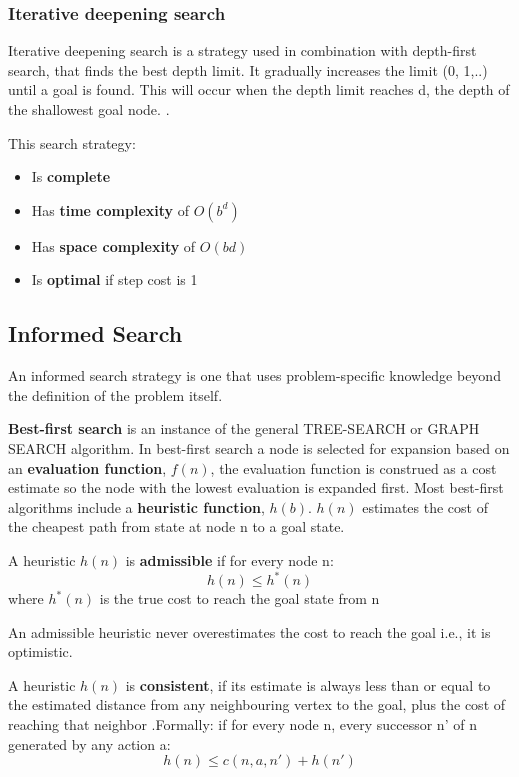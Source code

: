 \documentclass{article}
\begin{document}
\subsubsection{Iterative deepening search}

Iterative deepening search is a strategy used in combination with depth-first search, that finds the best depth limit. It gradually increases the limit (0, 1,..) until a goal is found. This will occur when the depth limit reaches d, the depth of the shallowest goal node. . 

This search strategy:
\begin{itemize}
    \item Is \textbf{complete} 
    \item Has \textbf{time complexity} of $O(b^d)$ 
    \item Has \textbf{space complexity} of $O(bd)$
    \item Is \textbf{optimal} if step cost is 1
\end{itemize}

\subsection{Informed Search}

An informed search strategy is one that uses problem-specific knowledge beyond the definition of the problem itself.

\textbf{Best-first search} is an instance of the general TREE-SEARCH or GRAPH SEARCH algorithm. In best-first search a node is selected for expansion based on an \textbf{evaluation function}, $f(n)$, the evaluation function is construed as a cost estimate so the node with the lowest evaluation is expanded first. 
Most best-first algorithms include a \textbf{heuristic function}, $h(b)$. $h(n)$ estimates the cost of the cheapest path from state at node n to a goal state.  

A heuristic $h(n)$ is \textbf{admissible} if for every node n: $$h(n) \leq h^*(n)$$ where $h^*(n)$ is the true cost to reach the goal state from n 

An admissible heuristic never overestimates the cost to reach the goal i.e., it is optimistic. 

A heuristic $h(n)$ is \textbf{consistent}, if its estimate is always less than or equal to the estimated distance from any neighbouring vertex to the goal, plus the cost of reaching that neighbor .Formally: if for every node n, every successor n' of n generated by any action a: $$h(n) \leq c(n, a, n') + h(n')$$ 
\end{document}
